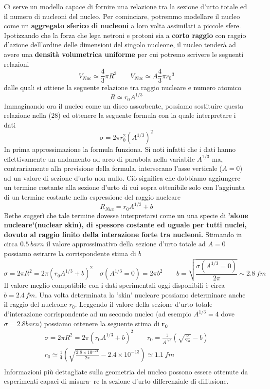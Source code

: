 Ci serve un modello capace di fornire una relazione tra la sezione d'urto totale ed il numero di nucleoni del nucleo.
Per cominciare, potremmo modellare il nucleo come un \textbf{aggregato sferico di nucleoni} a loro volta assimilati a piccole sfere.
Ipotizzando che la forza che lega netroni e protoni sia a \textbf{corto raggio} con raggio d'azione dell'ordine delle dimensioni del singolo nucleone, il nucleo tenderà ad avere una \textbf{densità volumetrica uniforme} per cui potremo scrivere le seguenti relazioni \[
	V_{Nuc} \simeq \frac{4}{3} \pi R^3 \qquad V_{Nuc} \simeq A\frac{4}{3} \pi {r_{0}}^3
\] dalle quali si ottiene la seguente relazione tra raggio nucleare e numero atomico \[
	R \simeq r_{0} A^{1/3}
\] Immaginando ora il nucleo come un disco assorbente, possiamo sostituire questa relazione nella ($28$) ed ottenere la seguente formula con la quale interpretare i dati \[
	\sigma = 2 \pi r_{0}^{2}(A^{1/3})^{2}
\] In prima approssimazione la formula funziona.
Si noti infatti che i dati hanno effettivamente un andamento ad arco di parabola nella variabile $A^{1/3}$ ma, contrariamente alla previsione della formula, intersecano l'asse verticale ($A=0$) ad un valore di sezione d'urto non nullo.
Ciò significa che dobbiamo aggiungere un termine costante alla sezione d'urto di cui sopra ottenibile solo con l'aggiunta di un termine costante nella espressione del raggio nucleare \[
	R_{Nuc} = r_{0} A^{1/3} + b
\] Bethe suggerì che tale termine dovesse interpretarsi come un una specie di \textbf{'alone nucleare'(nuclear skin), di spessore costante ed uguale per tutti nuclei, dovuto al raggio finito della interazione forte tra nucleoni.} Stimando in circa $0.5 \ barn$ il valore approssimativo della sezione d'urto totale ad $A=0$ possiamo estrarre la corrispondente stima di $b$ \[
	\sigma = 2 \pi R^{2} = 2 \pi (r_{0} A^{1/3} +b)^{2} \quad \sigma(A^{1/3}=0) = 2\pi b^{2} \qquad b = \sqrt{ \frac{\sigma(A^{1/3}=0)}{2 \pi} }\sim 2.8 \ fm
\] Il valore meglio compatibile con i dati sperimentali oggi disponibili è circa $b=2.4 \, fm$.
Una volta determinata la 'skin' nucleare possiamo determinare anche il raggio del nucleone $r_0$.
Leggendo il valore della sezione d'urto totale d'interazione corrispondente ad un secondo nucleo (ad esempio $A^{1/3}=4$ dove $\sigma = 2.8 barn$) possiamo ottenere la seguente stima di $\bm{r_0}$ \begin{gather*}
	\sigma = 2 \pi R^2 = 2 \pi (r_0 A^{1/3} +b)^2  \qquad r_0 = \frac{1}{A^{1/3}} \left( \sqrt{\frac{\sigma}{2 \pi}}-b \right)\\
	r_0 \simeq \frac{1}{4} \left( \sqrt{\frac{2.8 \times 10^{-24}}{2 \pi} } - 2.4 \times 10^{-13} \right) \simeq1.1 \ fm\\
\end{gather*} Informazioni più dettagliate sulla geometria del nucleo possono essere ottenute da esperimenti capaci di misura- re la sezione d'urto differenziale di diffusione.
